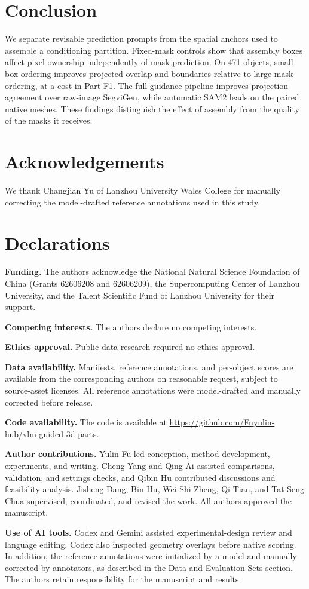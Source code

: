 \documentclass[pdflatex,sn-mathphys-ay]{sn-jnl}
\newcommand{\codeurl}{\url{https://github.com/Fuyulin-hub/vlm-guided-3d-parts}}
\begin{document}
\FloatBarrier
\section{Conclusion}\label{sec:conclusion}
We separate revisable prediction prompts from the spatial anchors used to assemble a conditioning partition. Fixed-mask controls show that assembly boxes affect pixel ownership independently of mask prediction. On 471 objects, small-box ordering improves projected overlap and boundaries relative to large-mask ordering, at a cost in Part F1. The full guidance pipeline improves projection agreement over raw-image SegviGen, while automatic SAM2 leads on the paired native meshes. These findings distinguish the effect of assembly from the quality of the masks it receives.

\section*{Acknowledgements}
We thank Changjian Yu of Lanzhou University Wales College for manually correcting the model-drafted reference annotations used in this study.

\section*{Declarations}

\textbf{Funding.} The authors acknowledge the National Natural Science Foundation of China (Grants 62606208 and 62606209), the Supercomputing Center of Lanzhou University, and the Talent Scientific Fund of Lanzhou University for their support.

\textbf{Competing interests.} The authors declare no competing interests.

\textbf{Ethics approval.} Public-data research required no ethics approval.

\textbf{Data availability.} Manifests, reference annotations, and per-object scores are available from the corresponding authors on reasonable request, subject to source-asset licenses. All reference annotations were model-drafted and manually corrected before release.

\textbf{Code availability.} The code is available at \codeurl.

\textbf{Author contributions.} Yulin Fu led conception, method development, experiments, and writing. Cheng Yang and Qing Ai assisted comparisons, validation, and settings checks, and Qibin Hu contributed discussions and feasibility analysis. Jisheng Dang, Bin Hu, Wei-Shi Zheng, Qi Tian, and Tat-Seng Chua supervised, coordinated, and revised the work. All authors approved the manuscript.

\textbf{Use of AI tools.} Codex and Gemini assisted experimental-design review and language editing. Codex also inspected geometry overlays before native scoring. In addition, the reference annotations were initialized by a model and manually corrected by annotators, as described in the Data and Evaluation Sets section. The authors retain responsibility for the manuscript and results.


\end{document}

